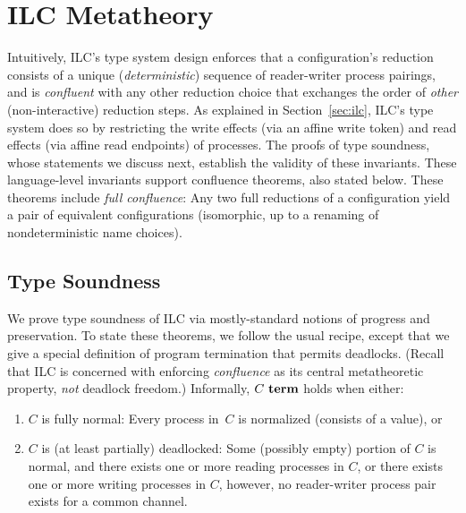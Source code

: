 \section{ILC Metatheory}
\label{sec:metatheory}


Intuitively, ILC's type system design enforces that a
configuration's reduction consists of a unique
(\emph{deterministic}) sequence of reader-writer process pairings,
and is \emph{confluent} with any other reduction choice that exchanges 
the order of \emph{other} (non-interactive) reduction steps.
%
As explained in Section~\ref{sec:ilc}, ILC's type system does so by restricting the
write effects (via an affine write token) and read effects (via affine read
endpoints) of processes.
%
The proofs of type soundness, whose statements we discuss next, 
establish the validity of these invariants.
%
These language-level invariants support confluence theorems, also
stated below.
%
These theorems include \emph{full confluence}:
Any two full reductions of a configuration yield a pair of equivalent configurations
(isomorphic, up to a renaming of nondeterministic name choices).
%

\subsection{Type Soundness}

We prove type soundness of ILC via mostly-standard notions of progress
and preservation.
%
To state these theorems, we follow the usual recipe, except that we give a
special definition of program termination that permits deadlocks. (Recall that
ILC is concerned with enforcing \emph{confluence} as its central metatheoretic
property, \emph{not} deadlock freedom.)
%
Informally, $C~\textbf{term}$ holds when either:
\begin{enumerate}[leftmargin=*]
 \item $C$ is fully normal: Every process in~$C$ is normalized (consists of a
   value), or
 \item $C$ is (at least partially) deadlocked: Some (possibly empty) portion of
   $C$ is normal, and there exists one or more reading processes in $C$, or
   there exists one or more writing processes in $C$, however, no reader-writer
   process pair exists for a common channel.
\end{enumerate}

%


